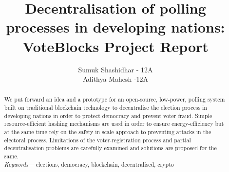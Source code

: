 \documentclass{article}
\title{Decentralisation of polling processes in developing nations: VoteBlocks Project Report}
\author{Sumuk Shashidhar - 12A \\ Adithya Mahesh -12A}
\affil{Sri Kumaran Children's Home}
\begin{document}
    \maketitle
    \begin{abstract}
        We put forward an idea and a prototype for an open-source, low-power, polling system built on traditional blockchain technology to decentralise the election process in developing nations in order to protect democracy and prevent voter fraud. Simple resource-efficient hashing mechanisms are used in order to ensure energy-efficiency but at the same time rely on the safety in scale approach to preventing attacks in the electoral process. Limitations of the voter-registration process and partial decentralisation problems are carefully examined and solutions are proposed for the same. \\

        \textit{Keywords}— elections, democracy, blockchain, decentralised, crypto
    \end{abstract}
    \pagebreak
    \tableofcontents
    
\end{document}
